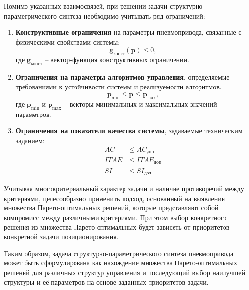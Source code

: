 Помимо указанных взаимосвязей, при решении задачи структурно-параметрического
синтеза необходимо учитывать ряд ограничений:

\begin{enumerate}
	\item \textbf{Конструктивные ограничения} на параметры пневмопривода,
	      связанные с физическими свойствами системы:
	      \begin{equation}
		      \mathbf{g}_{\text{конст}}(\mathbf{p}) \leq 0,
	      \end{equation}
	      где $\mathbf{g}_{\text{конст}}$ -- вектор-функция конструктивных ограничений.

	\item \textbf{Ограничения на параметры алгоритмов управления}, определяемые
	      требованиями к устойчивости системы и реализуемости алгоритмов:
	      \begin{equation}
		      \mathbf{p}_{\min} \leq \mathbf{p} \leq \mathbf{p}_{\max},
	      \end{equation}
	      где $\mathbf{p}_{\min}$ и $\mathbf{p}_{\max}$ -- векторы минимальных и максимальных значений параметров.

	\item \textbf{Ограничения на показатели качества системы}, задаваемые техническим заданием:
	      \begin{equation}
		      \begin{aligned}
			      AC   & \leq AC_{\text{доп}}   \\
			      ITAE & \leq ITAE_{\text{доп}} \\
			      SI   & \leq SI_{\text{доп}}
		      \end{aligned}
	      \end{equation}
\end{enumerate}

Учитывая многокритериальный характер задачи и наличие противоречий между критериями,
целесообразно применить подход, основанный на выявлении множества Парето-оптимальных решений,
которые представляют собой компромисс между различными критериями. При этом выбор конкретного
решения из множества Парето-оптимальных будет зависеть от приоритетов конкретной задачи позиционирования.

Таким образом, задача структурно-параметрического синтеза пневмопривода может быть сформулирована как
нахождение множества Парето-оптимальных решений для различных структур управления и
последующий выбор наилучшей структуры и её параметров на основе заданных приоритетов задачи.